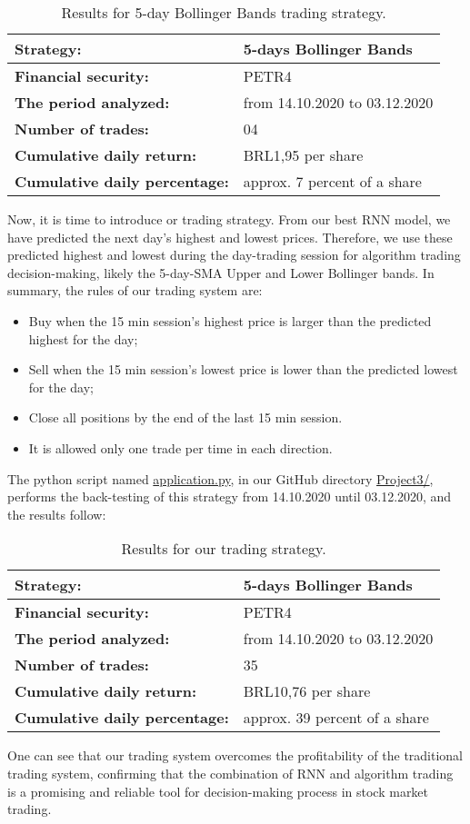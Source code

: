 \begin{table}[H]
\centering
\begin{tabular}{ |l||l| }
\hline
\textbf{Strategy:} & 5-days Bollinger Bands\\
\hline
\textbf{Financial security:} & PETR4\\
\hline
\textbf{The period analyzed:} & from 14.10.2020 to 03.12.2020\\
\hline
\textbf{Number of trades:} & 04\\
\hline
\textbf{Cumulative daily return:} & BRL1,95 per share\\
\hline
\textbf{Cumulative daily percentage:} & approx. 7 percent of a share\\
\hline
\end{tabular}
\caption{Results for 5-day Bollinger Bands trading strategy.}
\end{table}

Now, it is time to introduce or trading strategy. From our best RNN model, we have predicted the next day's highest and lowest prices. Therefore, we use these predicted highest and lowest during the day-trading session for algorithm trading decision-making, likely the 5-day-SMA Upper and Lower Bollinger bands. In summary, the rules of our trading system are:

\begin{itemize}
    \item Buy when the 15 min session's highest price is larger than the predicted highest for the day;
    \item Sell when the 15 min session's lowest price is lower than the predicted lowest for the day;
    \item Close all positions by the end of the last 15 min session.
    \item It is allowed only one trade per time in each direction.
\end{itemize}

The python script named \href{https://github.com/fabiorodp/UiO-FYS-STK4155/tree/master/Project3/application.py}{application.py}, in our GitHub directory \href{https://github.com/fabiorodp/UiO-FYS-STK4155/tree/master/Project3/}{Project3/}, performs the back-testing of this strategy from 14.10.2020 until 03.12.2020, and the results follow:

\begin{table}[H]
\centering
\begin{tabular}{ |l||l| }
\hline
\textbf{Strategy:} & 5-days Bollinger Bands\\
\hline
\textbf{Financial security:} & PETR4\\
\hline
\textbf{The period analyzed:} & from 14.10.2020 to 03.12.2020\\
\hline
\textbf{Number of trades:} & 35\\
\hline
\textbf{Cumulative daily return:} & BRL10,76 per share\\
\hline
\textbf{Cumulative daily percentage:} & approx. 39 percent of a share\\
\hline
\end{tabular}
\caption{Results for our trading strategy.}
\end{table}

One can see that our trading system overcomes the profitability of the traditional trading system, confirming that the combination of RNN and algorithm trading is a promising and reliable tool for decision-making process in stock market trading.
